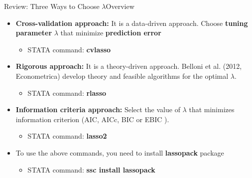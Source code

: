 \documentclass[hyperref={pdfpagelabels=false}]{beamer}
\begin{document}
\begin{frame}{Review: Three Ways to Choose $\lambda$}{Overview}
	\begin{itemize}
		\item[1] \textbf{Cross-validation approach:} It is a data-driven approach. Choose \textbf{tuning parameter} $\lambda$ that minimize \textbf{prediction
			error}
		\vspace{0.2cm}
			\begin{itemize}
		\item STATA command: \textbf{cvlasso}
			\end{itemize}
				\vspace{0.2cm}
		\item[2] \textbf{Rigorous approach:} It is a theory-driven approach. Belloni et al. (2012, Econometrica) develop theory and feasible algorithms for the optimal $\lambda$.
			\vspace{0.2cm}
		\begin{itemize}
			\item STATA command: \textbf{rlasso}
		\end{itemize}

		\vspace{0.2cm}
		\item[3] \textbf{Information criteria approach:} Select the value of $\lambda$ that minimizes information criterion (AIC, AICc, BIC or EBIC
).
			\vspace{0.2cm}
		\begin{itemize}
			\item STATA command: \textbf{lasso2}
		\end{itemize}
					\vspace{0.2cm}
		\item To use the above commands, you need to install \textbf{lassopack} package
			\vspace{0.2cm}
		\begin{itemize}
			\item STATA command: \textbf{ssc install lassopack}
		\end{itemize}
		
		
	\end{itemize}
\end{frame}
\end{document}
